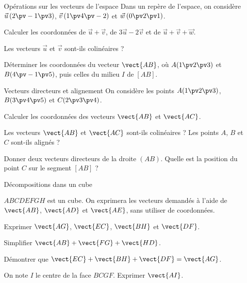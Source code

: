 \exercices
{}

\begin{exercice}[1]{Opérations sur les vecteurs de l'espace}
Dans un repère de l'espace, on considère $\vec u\,(2\pv-1\pv3)$, $\vec v\,(1\pv4\pv-2)$ et $\vec w\,(0\pv2\pv1)$.
\begin{questions}
  \item Calculer les coordonnées de $\vec u+\vec v$, de $3\vec u-2\vec v$ et de $\vec u+\vec v+\vec w$.
  \item Les vecteurs $\vec u$ et $\vec v$ sont-ils colinéaires ?
  \item Déterminer les coordonnées du vecteur $\vect{AB}$, où $A(1\pv2\pv3)$ et $B(4\pv-1\pv5)$, puis celles du milieu $I$ de $[AB]$.
\end{questions}
\end{exercice}

\begin{exercice}[1]{Vecteurs directeurs et alignement}
On considère les points $A(1\pv2\pv3)$, $B(3\pv4\pv5)$ et $C(2\pv3\pv4)$.
\begin{questions}
  \item Calculer les coordonnées des vecteurs $\vect{AB}$ et $\vect{AC}$.
  \item Les vecteurs $\vect{AB}$ et $\vect{AC}$ sont-ils colinéaires ? Les points $A$, $B$ et $C$ sont-ils alignés ?
  \item Donner deux vecteurs directeurs de la droite $(AB)$. Quelle est la position du point $C$ sur le segment $[AB]$ ?
\end{questions}
\end{exercice}

\begin{exercice}[1]{Décompositions dans un cube}
\begin{codecote}[0.62]
$ABCDEFGH$ est un cube. On exprimera les vecteurs demandés à l'aide de $\vect{AB}$, $\vect{AD}$ et $\vect{AE}$, sans utiliser de
coordonnées.
\begin{questions}
  \item Exprimer $\vect{AG}$, $\vect{EC}$, $\vect{BH}$ et $\vect{DF}$.
  \item Simplifier $\vect{AB}+\vect{FG}+\vect{HD}$.
  \item Démontrer que $\vect{EC}+\vect{BH}+\vect{DF}=\vect{AG}$.
  \item On note $I$ le centre de la face $BCGF$. Exprimer $\vect{AI}$.
\end{questions}
\cote
\centering
{}
\end{codecote}
\end{exercice}


